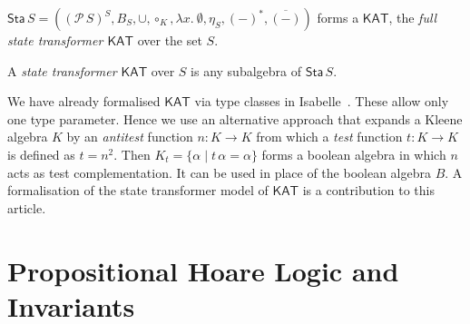 \documentclass[envcountsame]{llncs}
\newcommand{\KAT}{\mathsf{KAT}}
\newcommand{\Pow}{\mathcal{P}}
\newcommand{\sta}{\mathsf{Sta}}
\begin{document}
\begin{proposition}\label{P:kleisli-ka}
$\sta\, S = ((\Pow\, S)^S,B_S,\cup,\circ_K,\lambda x.\
  \emptyset, \eta_S,(-)^{\ast},\overline{(-)})$
  forms a $\KAT$, the \emph{full state transformer $\KAT$} over the
  set $S$.
\end{proposition}
A \emph{state transformer $\KAT$} over $S$ is any subalgebra of
$\sta\, S$. 

We have already formalised $\KAT$ via type classes in
Isabelle~\cite{afp:kat}.  These allow only one type parameter. Hence
we use an alternative approach that expands a Kleene algebra $K$ by an
\emph{antitest} function $n:K\to K$ from which a \emph{test} function
$t:K\to K$ is defined as $t=n^2$. Then
$K_t = \{\alpha \mid t\, \alpha = \alpha\}$ forms a boolean algebra in
which $n$ acts as test complementation. It can be used in place of the
boolean algebra $B$.  A formalisation of the state transformer model
of $\KAT$ is a contribution to this article.



\section{Propositional Hoare Logic and Invariants}\label{sec:hl-invariants}
\end{document}
